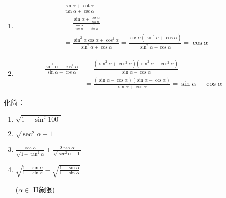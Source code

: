 \begin{solution}
\begin{enumerate}[(1)]
    \item \begin{align}
     &   \frac{\sin\alpha+\cot\alpha}{\tan\alpha+\csc\alpha} \tag{分析：函数种类多，化为正余弦}\\
     &=\frac{\sin\alpha+\frac{\cos\alpha}{\sin\alpha}}{\frac{\sin\alpha}{\cos\alpha}+\frac{1}{\sin\alpha}} \tag{分子、分母同乘以$\sin\alpha\cos\alpha$}\\
     &=\frac{\sin^2\alpha\cos\alpha+\cos^2\alpha}{\sin^2\alpha+\cos\alpha}=\frac{\cos\alpha(\sin^2\alpha+\cos\alpha)}{\sin^2\alpha+\cos\alpha}=\cos\alpha \nonumber
    \end{align}
\item \[\begin{split}
    \frac{\sin^4\alpha-\cos^4\alpha}{\sin\alpha+\cos\alpha}&=\frac{(\sin^2\alpha+\cos^2\alpha)(\sin^2\alpha-\cos^2\alpha)}{\sin\alpha+\cos\alpha}\\
    &=\frac{(\sin\alpha+\cos\alpha)(\sin\alpha-\cos\alpha)}{\sin\alpha+\cos\alpha}=\sin\alpha-\cos\alpha
\end{split}\]
\end{enumerate}
\end{solution}

\begin{example}
化简： \begin{multicols}{2}
\begin{enumerate}[(1)]
    \item $\sqrt{1-\sin^2 100^{\circ}}$
    \item $\sqrt{\sec^2\alpha -1}$
    \item $\frac{\sec\alpha}{\sqrt{1+\tan^2\alpha}}+\frac{2\tan\alpha}{\sqrt{\sec^2\alpha-1}}$
    \item $\sqrt{\frac{1+\sin\alpha}{1-\sin\alpha}}-\sqrt{\frac{1-\sin\alpha}{1+\sin\alpha}}$ 
    
    ($\alpha\in$ II象限)
\end{enumerate}
\end{multicols}
\end{example}

